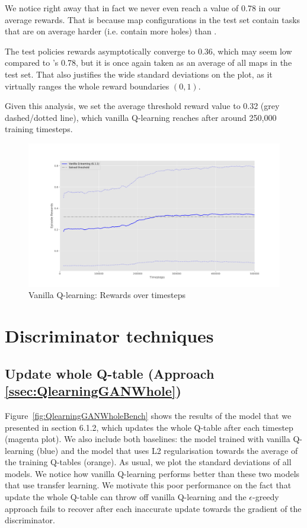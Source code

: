 We notice right away that in fact we never even reach a value of 0.78 in our average rewards. That is because map configurations in the test set contain tasks that are on average harder (i.e. contain more holes) than .

The test policies rewards asymptotically converge to 0.36, which may seem low compared to 's 0.78, but it is once again taken as an average of all maps in the test set. That also justifies the wide standard deviations on the plot, as it virtually ranges the whole reward boundaries $(0,1)$.

Given this analysis, we set the average threshold reward value to 0.32 (grey dashed/dotted line), which vanilla Q-learning reaches after around 250,000 training timesteps.

\begin{figure}[H]
\centering
\includegraphics[width=15cm]{Figures/QlearningBaselineBench}
\caption{Vanilla Q-learning: Rewards over timesteps}
\label{fig:QlearningBaselineBench}
\end{figure}


\section{Discriminator techniques}


\subsection{Update whole Q-table (Approach \ref{ssec:QlearningGANWhole})}
Figure~\ref{fig:QlearningGANWholeBench} shows the results of the model that we presented in section 6.1.2, which updates the whole Q-table after each timestep (magenta plot). 
We also include both baselines: the model trained with vanilla Q-learning (blue) and the model that uses L2 regularisation towards the average of the training Q-tables (orange).
As usual, we plot the standard deviations of all models.
We notice how vanilla Q-learning performs better than these two models that use transfer learning.
We motivate this poor performance on the fact that update the whole Q-table can throw off vanilla Q-learning and the $\epsilon$-greedy approach fails to recover after each inaccurate update towards the gradient of the discriminator.

